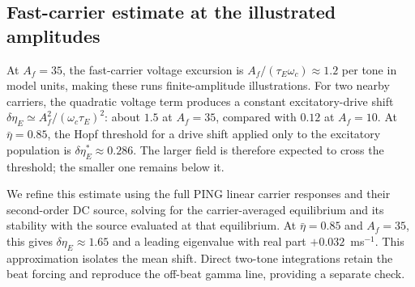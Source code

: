 \subsection{Fast-carrier estimate at the illustrated amplitudes}\label{app:qif-estimate}
At $A_f=35$, the fast-carrier voltage excursion is
$A_f/(\tau_E\omega_c)\approx1.2$ per tone in model units, making these
runs finite-amplitude illustrations.
For two nearby carriers, the quadratic voltage term produces a constant
excitatory-drive shift $\delta\eta_E\simeq A_f^2/(\omega_c\tau_E)^2$:
about $1.5$ at $A_f=35$, compared with $0.12$ at $A_f=10$.
At $\bar\eta=0.85$, the Hopf threshold for a drive shift applied only to
the excitatory population is $\delta\eta_E^*\approx0.286$.
The larger field is therefore expected to cross the threshold; the smaller
one remains below it.

We refine this estimate using the full PING linear carrier responses and their
second-order DC source, solving for the carrier-averaged equilibrium and its
stability with the source evaluated at that equilibrium. At $\bar\eta=0.85$
and $A_f=35$, this gives $\delta\eta_E\approx1.65$ and a leading eigenvalue
with real part $+0.032$~ms$^{-1}$. This approximation isolates the mean shift.
Direct two-tone integrations retain the beat forcing and reproduce the off-beat
gamma line, providing a separate check.
